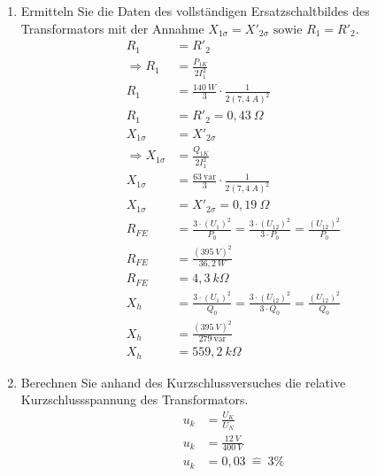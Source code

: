 \begin{enumerate}[label=\alph*)]
	\item Ermitteln Sie die Daten des vollständigen Ersatzschaltbildes des Transformators
	      mit der Annahme $X_{1\sigma} = X'_{2\sigma} \text{ sowie } R_1 = R'_2$.
	      \begin{align*}
		      R_1                     & = R'_2                                                             \\
		      \Rightarrow R_1         & =\frac{P_{1K}}{2I_1^2}                                             \\
		      R_1                     & = \frac{140\ W}{3}\cdot \frac{1}{2(7,4\ A)^2}                      \\
		      R_1                     & = R'_2= 0,43\ \Omega                                               \\
		      X_{1\sigma}             & = X'_{2\sigma}                                                     \\
		      \Rightarrow X_{1\sigma} & =\frac{Q_{1K}}{2I_1^2}                                             \\
		      X_{1\sigma}             & = \frac{63\ \text{var}}{3}\cdot \frac{1}{2(7,4\ A)^2}              \\
		      X_{1\sigma}             & = X'_{2\sigma}= 0,19\ \Omega                                       \\
		      R_{FE}                  & = \frac{3\cdot(U_1)^2}{P_0}=\frac{3\cdot(U_{12})^2}{3 \cdot P_0} =
		      \frac{(U_{12})^2}{P_0}                                                                       \\ R_{FE} & = \frac{(395\ V)^2}{36,2\ W} \\ R_{FE} & =
		      4,3\ k\Omega                                                                                 \\
		      X_{h}                   & = \frac{3\cdot(U_1)^2}{Q_0}=\frac{3\cdot(U_{12})^2}{3 \cdot Q_0} =
		      \frac{(U_{12})^2}{Q_0}                                                                       \\ X_{h} & = \frac{(395\ V)^2}{279\ \text{var}} \\ X_{h}
		                              & = 559,2\ k\Omega
	      \end{align*}

	\item Berechnen Sie anhand des Kurzschlussversuches die relative Kurzschlussspannung
	      des Transformators.
	      \begin{align*}
		      u_k & = \frac{U_K}{U_N}        \\
		      u_k & = \frac{12\ V}{400\ V}   \\
		      u_k & = 0,03\ \widehat{=}\ 3\%
	      \end{align*}

	      \pagebreak

\end{enumerate}

